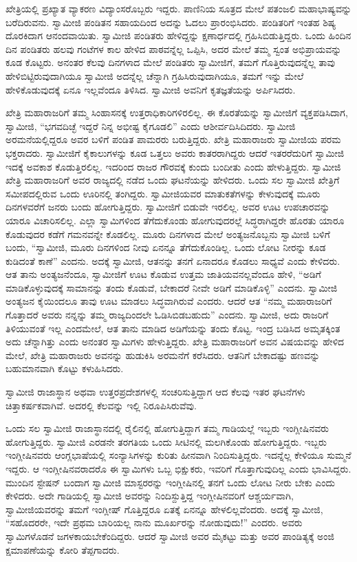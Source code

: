  ಖೇತ್ರಿಯಲ್ಲಿ ಪ್ರಖ್ಯಾತ ವ್ಯಾಕರಣ ವಿದ್ಯಾಂಸರೊಬ್ಬರು ಇದ್ದರು. ಪಾಣಿನಿಯ ಸೂತ್ರದ ಮೇಲೆ ಪತಂಜಲಿ ಮಹಾಭಾಷ್ಯವನ್ನು ಬರೆದಿರುವನು. ಸ್ವಾಮೀಜಿ ಪಂಡಿತನ ಸಹಾಯದಿಂದ ಅದನ್ನು ಓದಲು ಪ್ರಾರಂಭಿಸಿದರು. ಪಂಡಿತರಿಗೆ ಇಂತಹ ಶಿಷ್ಯ ದೊರಕಿದಾಗ ಆನಂದವಾಯಿತು. ಸ್ವಾಮೀಜಿ ಪಂಡಿತರು ಹೇಳಿದ್ದನ್ನು ಕ್ಷಣಾರ್ಧದಲ್ಲಿ ಗ್ರಹಿಸಿಬಿಡುತ್ತಿದ್ದರು. ಒಂದು ಹಿಂದಿನ ದಿನ ಪಂಡಿತರು ಹಲವು ಗಂಟೆಗಳ ಕಾಲ ಹೇಳಿದ ಪಾಠವನ್ನೆಲ್ಲ ಒಪ್ಪಿಸಿ, ಅದರ ಮೇಲೆ ತಮ್ಮ ಸ್ವಂತ ಅಭಿಪ್ರಾಯವನ್ನು ಕೂಡ ಕೊಟ್ಟರು. ಅನಂತರ ಕೆಲವು ದಿನಗಳಾದ ಮೇಲೆ ಪಂಡಿತರು ಸ್ವಾಮೀಜಿಗೆ, ತಮಗೆ ಗೊತ್ತಿರುವುದನ್ನೆಲ್ಲ ತಾವು ಹೇಳಿಬಿಟ್ಟಿರುವುದಾಗಿಯೂ ಸ್ವಾಮೀಜಿ ಅದನ್ನೆಲ್ಲ ಚೆನ್ನಾಗಿ ಗ್ರಹಿಸಿರುವುದಾಗಿಯೂ, ತಮಗೆ ಇನ್ನು ಮೇಲೆ ಹೇಳಿಕೊಡುವುದಕ್ಕೆ ಏನೂ ಇಲ್ಲವೆಂದೂ ತಿಳಿಸಿದ. ಸ್ವಾಮೀಜಿ ಅವನಿಗೆ ಕೃತಜ್ಞತೆಯನ್ನು ಅರ್ಪಿಸಿದರು. 

 ಖೇತ್ರಿ ಮಹಾರಾಜರಿಗೆ ತಮ್ಮ ಸಿಂಹಾಸನಕ್ಕೆ ಉತ್ತರಾಧಿಕಾರಿಗಳಿರಲಿಲ್ಲ. ಈ ಕೊರತೆಯನ್ನು ಸ್ವಾಮೀಜಿಗೆ ವ್ಯಕ್ತಪಡಿಸಿದಾಗ, ಸ್ವಾಮೀಜಿ, “ಭಗವದಿಚ್ಛೆ ಇದ್ದರೆ ನಿನ್ನ ಅಭೀಷ್ಟ ಕೈಗೂಡಲಿ” ಎಂದು ಆಶೀರ್ವದಿಸಿದಿದರು. ಸ್ವಾಮೀಜಿ ಅರಮನೆಯಲ್ಲಿದ್ದರೂ ಅವರ ಬಳಿಗೆ ಪಂಡಿತ ಪಾಮರರು ಬರುತ್ತಿದ್ದರು. ಖೇತ್ರಿ ಮಹಾರಾಜರು ಸ್ವಾಮೀಜಿಯ ಪರಮ ಭಕ್ತರಾದರು. ಸ್ವಾಮೀಜಿಗೆ ಕೈಕಾಲುಗಳನ್ನು ಕೂಡ ಒತ್ತಲು ಅವರು ಕಾತರರಾಗಿದ್ದರು ಆದರೆ ಇತರರೆದುರಿಗೆ ಸ್ವಾಮೀಜಿ ಇದಕ್ಕೆ ಅವಕಾಶ ಕೊಡುತ್ತಿರಲಿಲ್ಲ. ಇದರಿಂದ ರಾಜರ ಗೌರವಕ್ಕೆ ಕುಂದು ಬಂದೀತು ಎಂದು ಹೇಳುತ್ತಿದ್ದರು. ಸ್ವಾಮೀಜಿ ಖೇತ್ರಿ ಮಹಾರಾಜರಿಗೆ ಅವರ ರಾಜ್ಯದಲ್ಲಿ ನಡೆದ ಒಂದು ಘಟನೆಯನ್ನು ಹೇಳಿದರು. ಒಂದು ಸಲ ಸ್ವಾಮೀಜಿ ಖೇತ್ರಿಗೆ ಸಮೀಪದಲ್ಲಿರುವ ಒಂದು ಊರಿನಲ್ಲಿ ತಂಗಿದ್ದರು. ಸ್ವಾಮೀಜಿಯವರ ಮಾತುಕತೆಗಳನ್ನು ಕೇಳುವುದಕ್ಕೆ ಮೂರು ದಿನಗಳವರೆಗೆ ಜನರು ಬಂದು ಹೋಗುತ್ತಿದ್ದರು. ಸ್ವಾಮೀಜಿಗೆ ಬಿಡುವೇ ಇರಲಿಲ್ಲ. ಅವರ ಊಟ ಉಪಚಾರವನ್ನು ಯಾರೂ ವಿಚಾರಿಸಲಿಲ್ಲ. ಎಲ್ಲಾ ಸ್ವಾಮಿಗಳಿಂದ ತೆಗೆದುಕೊಂಡು ಹೋಗುವುದರಲ್ಲೆ ಸಿದ್ಧರಾಗಿದ್ದರೇ ಹೊರತು ಯಾರೂ ಕೊಡುವುದರ ಕಡೆಗೆ ಗಮನವನ್ನೇ ಕೊಡಲಿಲ್ಲ. ಮೂರು ದಿನಗಳಾದ ಮೇಲೆ ಅಂತ್ಯಜನೊಬ್ಬನು ಸ್ವಾಮೀಜಿ ಬಳಿಗೆ ಬಂದು, “ಸ್ವಾಮೀಜಿ, ಮೂರು ದಿನಗಳಿಂದ ನೀವು ಏನನ್ನೂ ತೆಗೆದುಕೊಂಡಿಲ್ಲ. ಒಂದು ಲೋಟ ನೀರನ್ನು ಕೂಡ ಕುಡಿದಂತೆ ಕಾಣೆ” ಎಂದನು. ಅದಕ್ಕೆ ಸ್ವಾಮೀಜಿ, ಆತನನ್ನು ತನಗೆ ಏನಾದರೂ ಕೊಡಲು ಸಾಧ್ಯವೆ ಎಂದು ಕೇಳಿದರು. ಆತ ತಾನು ಅಂತ್ಯಜನೆಂದೂ, ಸ್ವಾಮೀಜಿಗೆ ಊಟ ಕೊಡುವ ಉತ್ತಮ ಜಾತಿಯವನಲ್ಲವೆಂದೂ ಹೇಳಿ, “ಅಡಿಗೆ ಮಾಡಿಕೊಳ್ಳುವುದಕ್ಕೆ ಸಾಮಾನನ್ನು ತಂದು ಕೊಡುವೆ, ಬೇಕಾದರೆ ನೀವೇ ಅಡಿಗೆ ಮಾಡಿಕೊಳ್ಳಿ” ಎಂದನು. ಸ್ವಾಮೀಜಿ ಅಂತ್ಯಜನ ಕೈಯಿಂದಲೂ ತಾವು ಊಟ ಮಾಡಲು ಸಿದ್ಧವಾಗಿರುವೆ ಎಂದರು. ಆದರೆ ಆತ “ನಮ್ಮ ಮಹಾರಾಜರಿಗೆ ಗೊತ್ತಾದರೆ ಅವರು ನನ್ನನ್ನು ತಮ್ಮ ರಾಜ್ಯದಿಂದಲೇ ಓಡಿಸಿಬಿಡಬಹುದು” ಎಂದನು. ಸ್ವಾಮೀಜಿ, ಅದು ರಾಜರಿಗೆ ತಿಳಿಯುವಂತೆ ಇಲ್ಲ ಎಂದಮೇಲೆ, ಆತ ತಾನು ಮಾಡಿದ ಅಡಿಗೆಯನ್ನು ತಂದು ಕೊಟ್ಟ. ಇಂದ್ರ ಬಡಿಸಿದ ಅಮೃತಕ್ಕಿಂತ ಅದು ಚೆನ್ನಾಗಿತ್ತು ಎಂದು ಅನಂತರ ಸ್ವಾಮಿಗಳು ಹೇಳುತ್ತಿದ್ದರು. ಖೇತ್ರಿ ಮಹಾರಾಜರಿಗೆ ಅವನ ವಿಷಯವನ್ನು ಹೇಳಿದ ಮೇಲೆ, ಖೇತ್ರಿ ಮಹಾರಾಜರು ಅವನನ್ನು ಹುಡುಕಿಸಿ ಅರಮನೆಗೆ ಕರೆಸಿದರು. ಆತನಿಗೆ ಬೇಕಾದಷ್ಟು ಹಣವನ್ನು ಬಹುಮಾನವಾಗಿ ಕೊಟ್ಟು ಕಳುಹಿಸಿದರು. 

 ಸ್ವಾಮೀಜಿ ರಾಜಾಸ್ಥಾನ ಅಥವಾ ಉತ್ತರಪ್ರದೇಶಗಳಲ್ಲಿ ಸಂಚರಿಸುತ್ತಿದ್ದಾಗ ಆದ ಕೆಲವು ಇತರ ಘಟನೆಗಳು ಚಿತ್ತಾಕರ್ಷಕವಾಗಿವೆ. ಅದರಲ್ಲಿ ಕೆಲವನ್ನು ಇಲ್ಲಿ ನಿರೂಪಿಸಿರುವೆವು. 

 ಒಂದು ಸಲ ಸ್ವಾಮೀಜಿ ರಾಜಾಸ್ಥಾನದಲ್ಲಿ ರೈಲಿನಲ್ಲಿ ಹೋಗುತ್ತಿದ್ದಾಗ ತಮ್ಮ ಗಾಡಿಯಲ್ಲೆ ಇಬ್ಬರು ಇಂಗ್ಲೀಷಿನವರು ಹೋಗುತ್ತಿದ್ದರು. ಸ್ವಾಮೀಜಿ ಎರಡನೇ ತರಗತಿಯ ಒಂದು ಸೀಟಿನಲ್ಲಿ ಮಲಗಿಕೊಂಡು ಹೋಗುತ್ತಿದ್ದರು. ಇಬ್ಬರು ಇಂಗ್ಲೀಷಿನವರು ಆಂಗ್ಲಭಾಷೆಯಲ್ಲಿ ಸಂನ್ಯಾಸಿಗಳನ್ನು ಕುರಿತು ಹೀನವಾಗಿ ನಿಂದಿಸುತ್ತಿದ್ದರು. ಇದನ್ನೆಲ್ಲ ಕೇಳಿಯೂ ಸುಮ್ಮನೆ ಇದ್ದರು. ಆ ಇಂಗ್ಲೀಷಿನವರಾದರೊ ಈ ಸ್ವಾಮಿಗಳು ಒಬ್ಬ ಭಿಕ್ಷುಕರು, ಇವರಿಗೆ ಗೊತ್ತಾಗುವುದಿಲ್ಲ ಎಂದು ಭಾವಿಸಿದ್ದರು. ಮುಂದಿನ ಸ್ಟೇಷನ್ ಬಂದಾಗ ಸ್ವಾಮೀಜಿ ಮಾಸ್ಟರರನ್ನು ಇಂಗ್ಲೀಷಿನಲ್ಲಿ ತನಗೆ ಒಂದು ಲೋಟ ನೀರು ಬೇಕು ಎಂದು ಕೇಳಿದರು. ಅದೇ ಗಾಡಿಯಲ್ಲಿ ಸ್ವಾಮೀಜಿ ಅವರನ್ನು ನಿಂದಿಸ್ದುತ್ತಿದ್ದ ಇಂಗ್ಲೀಷಿನವರಿಗೆ ಆಶ್ಚರ್ಯವಾಗಿ, ಸ್ವಾಮೀಜಿಯವರನ್ನು ತಮಗೆ ಇಂಗ್ಲೀಷ್ ಗೊತ್ತಿದ್ದರೂ ಏತಕ್ಕೆ ಏನನ್ನೂ ಹೇಳಲಿಲ್ಲವೆಂದರು. ಅದಕ್ಕೆ ಸ್ವಾಮೀಜಿ, “ಸಹೊದರರೇ, ಇದೇ ಪ್ರಥಮ ಬಾರಿಯಲ್ಲ ನಾನು ಮೂರ್ಖರನ್ನು ನೋಡುವುದು!” ಎಂದರು. ಅವರು ಸ್ವಾಮಿಗಳೊಡನೆ ಜಗಳಕಾಯಬೇಕೆಂದಿದ್ದರು. ಆದರೆ ಸ್ವಾಮೀಜಿ ಅವರ ಮೈಕಟ್ಟು ಮತ್ತು ಅವರ ಪಾಂಡಿತ್ಯಕ್ಕೆ ಅಂಜಿ ಕ್ಷಮಾಪಣೆಯನ್ನು ಕೋರಿ ತೆಪ್ಪಗಾದರು. 

